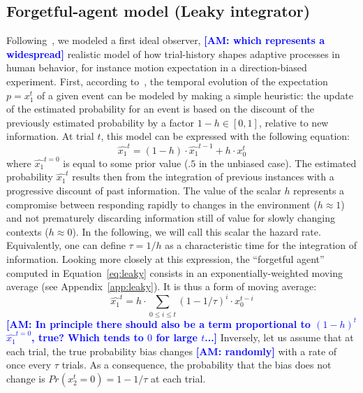 \documentclass[12pt,english]{article}%
\newcommand{\choice}[1]{ %
	\left\{ %
		\begin{array}{l} #1 \end{array} %
	\right. }
\newcommand{\eql}[1]{\begin{equation}#1\end{equation}}
\newcommand{\citet}[1]{\textcite{#1}}
\newcommand{\seeEq}[1]{Equation~\ref{eq:#1}}
\newcommand{\seeApp}[1]{Appendix~\ref{app:#1}}
\newcommand{\AM}[1]{\textbf{\textcolor{blue}{[AM: #1]}}}
\begin{document}
\subsection{Forgetful-agent model (Leaky integrator)}%
Following~\citet{Maus2015},
we modeled a first ideal observer,
\AM{which represents a widespread}
realistic model of how trial-history shapes
adaptive processes in human behavior,
for instance motion expectation in a direction-biased experiment.
First, according to~\citet{Anderson2006},
the temporal evolution of the expectation $p=x_1^t$ of a given event
can be modeled by making a simple heuristic:
the update of the estimated probability for an event is based
on the discount of the previously estimated probability
by a factor $1 - h \in [0, 1]$, relative to new information.
At trial $t$, this model can be expressed with the following equation:
\eql{%
\hat{x_1}^{t} = (1 - h) \cdot \hat{x_1}^{t-1} + h \cdot x_0^t
\label{eq:leaky}}
where $\hat{x_1}^{t=0}$ is equal to some prior value ($.5$ in the unbiased case).
The estimated  probability $\hat{x_1}^{t}$ results then from the integration of previous instances
with a progressive discount of past information.
The value of the scalar $h$ represents
a compromise between responding rapidly
to changes in the environment ($h \approx 1$) and
not prematurely discarding information still of value
for slowly changing contexts  ($h \approx 0$).
In the following, we will call this scalar the hazard rate.
Equivalently, one can define $\tau = 1 / h$ as
a characteristic time for the integration of information.
Looking more closely at this expression,
the ``forgetful agent'' computed in \seeEq{leaky}
consists in an exponentially-weighted moving average (see \seeApp{leaky}).
It is thus a form of moving average:
\eql{
\hat{x_1}^{t} = h \cdot \sum_{0\leq i \leq t} (1 - 1/\tau)^{i} \cdot x_0^{t-i}
\label{eq:leaky2}}
\AM{In principle there should also be a term proportional to $(1-h)^{t}$$\hat{x_1}^{t=0}$, true? Which tends to $0$ for large $t$...}
Inversely, let us assume that at each trial,
the true probability bias changes \AM{randomly} with a rate of once
every $\tau$ trials.
As a consequence, the probability that the bias does not change is $Pr(x_2^t=0)=1-1/\tau$ at each trial.
\end{document}
